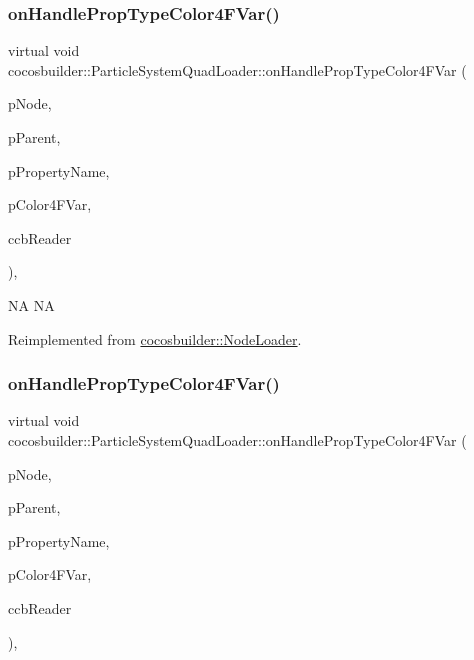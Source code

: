\subsubsection{\texorpdfstring{on\+Handle\+Prop\+Type\+Color4\+F\+Var()}{onHandlePropTypeColor4FVar()}\hspace{0.1cm}{\footnotesize\ttfamily [1/2]}}
{\footnotesize\ttfamily virtual void cocosbuilder\+::\+Particle\+System\+Quad\+Loader\+::on\+Handle\+Prop\+Type\+Color4\+F\+Var (\begin{DoxyParamCaption}\item[{cocos2d\+::\+Node $\ast$}]{p\+Node,  }\item[{cocos2d\+::\+Node $\ast$}]{p\+Parent,  }\item[{const char $\ast$}]{p\+Property\+Name,  }\item[{cocos2d\+::\+Color4F $\ast$}]{p\+Color4\+F\+Var,  }\item[{\hyperlink{classcocosbuilder_1_1CCBReader}{C\+C\+B\+Reader} $\ast$}]{ccb\+Reader }\end{DoxyParamCaption})\hspace{0.3cm}{\ttfamily [protected]}, {\ttfamily [virtual]}}

NA  NA 

Reimplemented from \hyperlink{classcocosbuilder_1_1NodeLoader}{cocosbuilder\+::\+Node\+Loader}.

\mbox{\label{classcocosbuilder_1_1ParticleSystemQuadLoader_ab31492ee9f4834fd84213d39cfa5a538}} 
\subsubsection{\texorpdfstring{on\+Handle\+Prop\+Type\+Color4\+F\+Var()}{onHandlePropTypeColor4FVar()}\hspace{0.1cm}{\footnotesize\ttfamily [2/2]}}
{\footnotesize\ttfamily virtual void cocosbuilder\+::\+Particle\+System\+Quad\+Loader\+::on\+Handle\+Prop\+Type\+Color4\+F\+Var (\begin{DoxyParamCaption}\item[{cocos2d\+::\+Node $\ast$}]{p\+Node,  }\item[{cocos2d\+::\+Node $\ast$}]{p\+Parent,  }\item[{const char $\ast$}]{p\+Property\+Name,  }\item[{cocos2d\+::\+Color4F $\ast$}]{p\+Color4\+F\+Var,  }\item[{\hyperlink{classcocosbuilder_1_1CCBReader}{C\+C\+B\+Reader} $\ast$}]{ccb\+Reader }\end{DoxyParamCaption})\hspace{0.3cm}{\ttfamily [protected]}, {\ttfamily [virtual]}}

